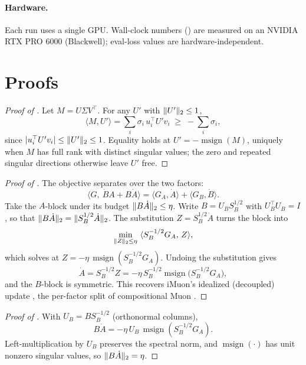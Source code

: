 \documentclass[11pt]{article}
\DeclarePairedDelimiter{\norm}{\lVert}{\rVert}
\DeclareMathOperator{\polar}{msign}          %
\theoremstyle{plain}
\theoremstyle{definition}
\theoremstyle{remark}
\begin{document}
\paragraph{Hardware.} Each run uses a single GPU. Wall-clock numbers ()
are measured on an NVIDIA RTX PRO 6000 (Blackwell); eval-loss values are
hardware-independent.

\section{Proofs}
\label{app:proofs}

\begin{proof}[Proof of ]
Let $M=U\Sigma V^\top$. For any $U'$ with $\norm{U'}_2\le1$,
\[
  \langle M,U'\rangle=\sum_i\sigma_i\,u_i^\top U' v_i \;\ge\; -\sum_i\sigma_i,
\]
since $|u_i^\top U' v_i|\le\norm{U'}_2\le1$. Equality holds at $U'=-\polar(M)$, uniquely when $M$ has full rank with distinct singular values; the zero and repeated singular directions otherwise leave $U'$ free.
\end{proof}

\begin{proof}[Proof of ]
The objective separates over the two factors:
\[
  \langle G,\ \dot B A+B\dot A\rangle=\langle G_A,\dot A\rangle+\langle G_B,\dot B\rangle .
\]
Take the $A$-block under its budget $\norm{B\dot A}_2\le\eta$. Write $B=U_B S_B^{1/2}$ with $U_B^\top U_B=I$, so that $\norm{B\dot A}_2=\norm{S_B^{1/2}\dot A}_2$. The substitution $Z=S_B^{1/2}\dot A$ turns the block into
\[
  \min_{\norm{Z}_2\le\eta}\ \langle S_B^{-1/2}G_A,\,Z\rangle,
\]
which  solves at $Z=-\eta\,\polar(S_B^{-1/2}G_A)$. Undoing the substitution gives
\[
  \dot A=S_B^{-1/2}Z=-\eta\,S_B^{-1/2}\polar\!\big(S_B^{-1/2}G_A\big),
\]
and the $B$-block is symmetric. This recovers iMuon's idealized (decoupled) update \cite{imuon}, the per-factor split of compositional Muon \cite{tilde_csd}.
\end{proof}

\begin{proof}[Proof of ]
With $U_B=BS_B^{-1/2}$ (orthonormal columns),
\[
  B\dot A=-\eta\,U_B\,\polar(S_B^{-1/2}G_A).
\]
Left-multiplication by $U_B$ preserves the spectral norm, and $\polar(\cdot)$ has unit nonzero singular values, so $\norm{B\dot A}_2=\eta$.
\end{proof}
\end{document}
